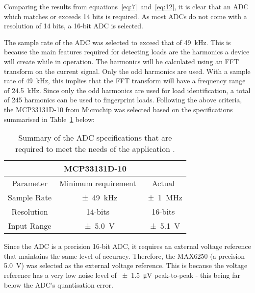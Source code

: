 Comparing the results from equations~\ref{eq:7}~and~\ref{eq:12}, it is clear that an ADC which matches or exceeds 14 bits is required. As most ADCs do not come with a resolution of 14 bits, a 16-bit ADC is selected.
\par
The sample rate of the ADC was selected to exceed that of \qty{49}{\kHz}. This is because the main features required for detecting loads are the harmonics a device will create while in operation. The harmonics will be calculated using an FFT transform on the current signal. Only the odd harmonics are used. With a sample rate of \qty{49}{\kHz}, this implies that the FFT transform will have a frequency range of
\qty{24.5}{\kHz}. Since only the odd harmonics are used for load identification, a total of 245 harmonics can be used to fingerprint loads. Following the above criteria, the MCP33131D-10 from Microchip was selected based on the specifications summarised in Table~\ref{tab:ADC_Summary} below: 
\begin{table}[H]
\small
\centering
\begin{tabular}{|ccc|}
\hline
\multicolumn{3}{|c|}{MCP33131D-10}                 \\ \hline
\multicolumn{1}{|c|}{Parameter}                     & \multicolumn{1}{c|}{Minimum requirement}  & Actual                            \\ \hline
\multicolumn{1}{|c|}{Sample Rate}                   & \multicolumn{1}{c|}{\qty{ \pm 49}{\kHz}}  & \qty{\pm 1}{\MHz}                 \\ \hline
\multicolumn{1}{|c|}{Resolution}                    & \multicolumn{1}{c|}{14-bits}              & 16-bits                           \\ \hline
\multicolumn{1}{|c|}{Input Range}   & \multicolumn{1}{c|}{\qty{\pm 5.0}{\volt}}                 & \qty{\pm 5.1}{\volt}              \\ \hline
\end{tabular}%
\caption{Summary of the ADC specifications that are required to meet the needs of the application \cite{Microchip:MCP33131D}.
}
\label{tab:ADC_Summary}
\end{table}
Since the ADC is a precision 16-bit ADC, it requires an external voltage reference that maintains the same level of accuracy. Therefore, the MAX6250 (a precision \qty{5.0}{\volt}) was selected as the external voltage reference. This is because the voltage reference has a very low noise level of \qty{\pm 1.5}{\uV} peak-to-peak - this being far below the ADC's quantisation error.

